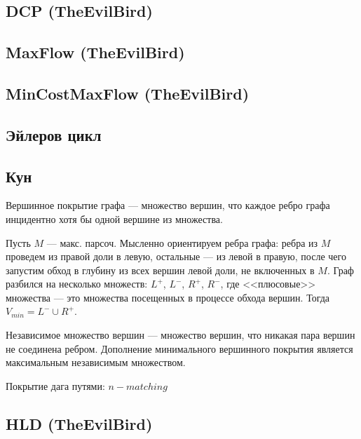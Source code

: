 \documentclass[a4paper]{article}
\begin{document}
\begin{multicols*}{2}
        \subsection{DCP (TheEvilBird)}
            
        
        \subsection{MaxFlow (TheEvilBird)}
            
                
        \subsection{MinCostMaxFlow (TheEvilBird)}
            
        
        \subsection{Эйлеров цикл}
            

        \subsection{Кун}
            

        Вершинное покрытие графа --- множество вершин, что каждое ребро графа инцидентно хотя бы одной вершине из множества.
        
        Пусть $M$ --- макс. парсоч. Мысленно ориентируем ребра графа: ребра из $M$ проведем из правой доли в левую, остальные --- из левой в правую, 
        после чего запустим обход в глубину из всех вершин левой доли, не включенных в $M$.
        Граф разбился на несколько множеств: $L^{+}$, $L^{-}$, $R^{+}$, $R^{-}$, где <<плюсовые>> множества --- это множества посещенных в процессе обхода вершин. Тогда $V_{min} = L^{-} \cup R^{+}$.

        Независимое множество вершин ---  множество вершин, что никакая пара вершин не соединена ребром. Дополнение минимального вершинного покрытия является максимальным независимым множеством.

        Покрытие дага путями: $n - matching$
        
        \subsection{HLD (TheEvilBird)}
            


\end{multicols*}
\end{document}
